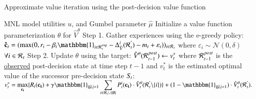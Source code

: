 \begin{algorithm}[b!]
\caption{Approximate value iteration using the post-decision value function}
\begin{algorithmic}[1]  %
\REQUIRE MNL model utilities $\hat{\mathit{u}}$, and Gumbel parameter $\hat{\mu}$
\STATE Initialize a value function parameterization $\theta$ for $\hat{V}^\theta$ 
    \STATE Step 1. Gather experiences using the e-greedy policy:
    \STATE \hspace{\algorithmicindent} $\begin{aligned}[t]
            \mathbf{\hat{c}}_{t} = (\max(0,r_i - \beta_i \mathbbm{1}_{i \in \mathcal{R}\hspace{0.05em}_t^{\mathrm{exp}}} - \Delta_{\hat{V}}^i(\mathcal{R}\hspace{0.05em}_t^{'}) - m_t + \varepsilon_{i}))_{i \in \mathcal{R}\hspace{0.05em}_{t}} 
            \end{aligned}$
            where $\varepsilon_{i} \sim \mathcal{N}(0,\delta)$  $\forall i \in \mathcal{R}\hspace{0.05em}_{t}$
    \STATE Step 2. Update $\theta$ using the target:
    \STATE \hspace{\algorithmicindent} $\begin{aligned}[t]
            \hat{V}^{\theta}(\mathcal{R}\hspace{0.05em}_{t-1}^{post}) \leftarrow v_t^*
            \end{aligned}$
    \STATE where $\mathcal{R}\hspace{0.05em}_{t-1}^{post}$ is the \underline{observed} post-decision state at time step $t-1$ and $v_t^*$ is the estimated optimal value of the successor pre-decision state $S\hspace{-0.1em}_t$:     
    \STATE \hspace{\algorithmicindent} $\begin{aligned}
            v_t^* = \max_{\mathbf{c_t}} \{ R_t(\mathbf{c_t}) +  \gamma \mathbbm{1}_{|\mathcal{G}_t|=1} \sum_{i \in \mathcal{R}\hspace{0.05em}_t\cup\{\emptyset\}}  P_t^i(\mathbf{c_t}) \cdot \hat{V}^{\theta}_t(\mathcal{R}\hspace{0.05em}_t^{'}\backslash\{i\}) \} + (1 - \mathbbm{1}_{|\mathcal{G}_t|=1}) \cdot \hat{V}^{\theta}_t(\mathcal{R}\hspace{0.05em}_t^{'}).
            \end{aligned}$
    \ENDFOR
\end{algorithmic}
\end{algorithm}

